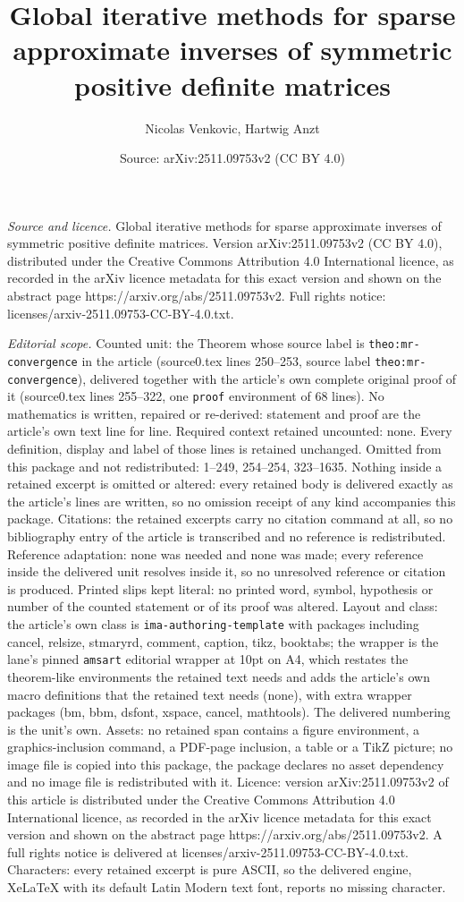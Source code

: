 \documentclass[10pt,a4paper]{amsart}
\title[Global iterative methods for sparse approximate inverses of ]{Global iterative methods for sparse approximate inverses of symmetric positive definite matrices}
\author{Nicolas Venkovic, Hartwig Anzt}
\date{Source: arXiv:2511.09753v2 (CC BY 4.0)}
\begin{document}
\maketitle

\noindent\emph{Source and licence.} Global iterative methods for sparse approximate inverses of symmetric positive definite matrices. Version arXiv:2511.09753v2 (CC BY 4.0), distributed under the Creative Commons Attribution 4.0 International licence, as recorded in the arXiv licence metadata for this exact version and shown on the abstract page https://arxiv.org/abs/2511.09753v2. Full rights notice: licenses/arxiv-2511.09753-CC-BY-4.0.txt.\par\smallskip

\noindent\textit{Editorial scope.} Counted unit: the Theorem whose source label is \texttt{theo:mr-convergence} in the article (source0.tex lines 250--253, source label \texttt{theo:mr-convergence}), delivered together with the article's own complete original proof of it (source0.tex lines 255--322, one \texttt{proof} environment of 68 lines). No mathematics is written, repaired or re-derived: statement and proof are the article's own text line for line. Required context retained uncounted: none. Every definition, display and label of those lines is retained unchanged. Omitted from this package and not redistributed: 1--249, 254--254, 323--1635. Nothing inside a retained excerpt is omitted or altered: every retained body is delivered exactly as the article's lines are written, so no omission receipt of any kind accompanies this package. Citations: the retained excerpts carry no citation command at all, so no bibliography entry of the article is transcribed and no reference is redistributed. Reference adaptation: none was needed and none was made; every reference inside the delivered unit resolves inside it, so no unresolved reference or citation is produced. Printed slips kept literal: no printed word, symbol, hypothesis or number of the counted statement or of its proof was altered. Layout and class: the article's own class is \texttt{ima-authoring-template} with packages including cancel, relsize, stmaryrd, comment, caption, tikz, booktabs; the wrapper is the lane's pinned \texttt{amsart} editorial wrapper at 10pt on A4, which restates the theorem-like environments the retained text needs and adds the article's own macro definitions that the retained text needs (none), with extra wrapper packages (bm, bbm, dsfont, xspace, cancel, mathtools). The delivered numbering is the unit's own. Assets: no retained span contains a figure environment, a graphics-inclusion command, a PDF-page inclusion, a table or a TikZ picture; no image file is copied into this package, the package declares no asset dependency and no image file is redistributed with it. Licence: version arXiv:2511.09753v2 of this article is distributed under the Creative Commons Attribution 4.0 International licence, as recorded in the arXiv licence metadata for this exact version and shown on the abstract page https://arxiv.org/abs/2511.09753v2. A full rights notice is delivered at licenses/arxiv-2511.09753-CC-BY-4.0.txt. Characters: every retained excerpt is pure ASCII, so the delivered engine, XeLaTeX with its default Latin Modern text font, reports no missing character.
\end{document}
